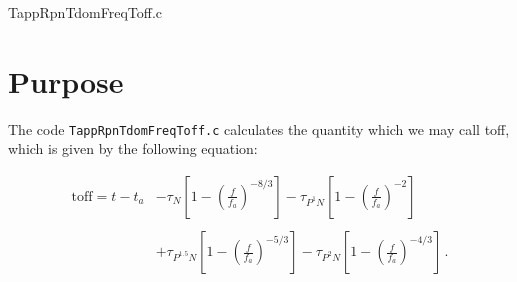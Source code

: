 \documentclass[12pt]{article}
\begin{document}
\huge
\begin{center}
TappRpnTdomFreqToff.c
\end{center}
\normalsize
\vspace{10mm}

\section{Purpose}

The code \texttt{TappRpnTdomFreqToff.c} calculates the quantity which we may call toff, which is given by the following equation:

\begin{equation}
\begin{split}
\mathrm{toff} = t - t_{a}  &  - \tau_{N} \left[ 1 - \left( \frac{f}{f_{a}} \right)^{-8/3} \right] - \tau_{P^{1}N} \left[ 1 - \left( \frac{f}{f_{a}} \right)^{-2} \right] \\  
    &  \\
          & + \tau_{P^{1.5}N} \left[ 1 - \left( \frac{f}{f_{a}} \right)^{-5/3} \right] - \tau_{P^{2}N} \left[ 1 - \left( \frac{f}{f_{a}} \right)^{-4/3} \right]  \,.
\end{split}
\label{toff}
\end{equation}
\end{document}
